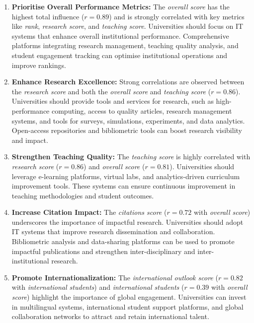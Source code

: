 \documentclass[conference]{IEEEtran}
\begin{document}
\begin{enumerate}
	\item \textbf{Prioritise Overall Performance Metrics:} The \textit{overall score} has the highest total influence (\(r = 0.89\)) and is strongly correlated with key metrics like \textit{rank}, \textit{research score}, and \textit{teaching score}. Universities should focus on IT systems that enhance overall institutional performance. Comprehensive platforms integrating research management, teaching quality analysis, and student engagement tracking can optimise institutional operations and improve rankings.
	
	
	\item \textbf{Enhance Research Excellence:} Strong correlations are observed between the \textit{research score} and both the \textit{overall score} and \textit{teaching score} (\(r = 0.86\)). Universities should provide tools and services for research, such as high-performance computing, access to quality articles, research management systems, and tools for surveys, simulations, experiments, and data analytics. Open-access repositories and bibliometric tools can boost research visibility and impact.
	
	\item \textbf{Strengthen Teaching Quality:} The \textit{teaching score} is highly correlated with \textit{research score} (\(r = 0.86\)) and \textit{overall score} (\(r = 0.81\)). Universities should leverage e-learning platforms, virtual labs, and analytics-driven curriculum improvement tools. These systems can ensure continuous improvement in teaching methodologies and student outcomes.
	
	\item \textbf{Increase Citation Impact:} The \textit{citations score} (\(r = 0.72\) with \textit{overall score}) underscores the importance of impactful research. Universities should adopt IT systems that improve research dissemination and collaboration. Bibliometric analysis and data-sharing platforms can be used to promote impactful publications and strengthen inter-disciplinary and inter-institutional research.
	
	\item \textbf{Promote Internationalization:} The \textit{international outlook score} (\(r = 0.82\) with \textit{international students}) and \textit{international students} (\(r = 0.39\) with \textit{overall score}) highlight the importance of global engagement. Universities can invest in multilingual systems, international student support platforms, and global collaboration networks to attract and retain international talent.
	

\end{enumerate}
\end{document}
